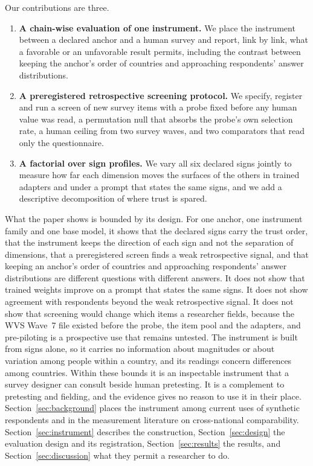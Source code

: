 Our contributions are three.
\begin{enumerate}
\item \textbf{A chain-wise evaluation of one instrument.} We place the instrument between a declared anchor and a human survey and report, link by link, what a favorable or an unfavorable result permits, including the contrast between keeping the anchor's order of countries and approaching respondents' answer distributions.
\item \textbf{A preregistered retrospective screening protocol.} We specify, register and run a screen of new survey items with a probe fixed before any human value was read, a permutation null that absorbs the probe's own selection rate, a human ceiling from two survey waves, and two comparators that read only the questionnaire.
\item \textbf{A factorial over sign profiles.} We vary all six declared signs jointly to measure how far each dimension moves the surfaces of the others in trained adapters and under a prompt that states the same signs, and we add a descriptive decomposition of where trust is spared.
\end{enumerate}

What the paper shows is bounded by its design. For one anchor, one instrument family and one base model, it shows that the declared signs carry the trust order, that the instrument keeps the direction of each sign and not the separation of dimensions, that a preregistered screen finds a weak retrospective signal, and that keeping an anchor's order of countries and approaching respondents' answer distributions are different questions with different answers. It does not show that trained weights improve on a prompt that states the same signs. It does not show agreement with respondents beyond the weak retrospective signal. It does not show that screening would change which items a researcher fields, because the WVS Wave~7 file existed before the probe, the item pool and the adapters, and pre-piloting is a prospective use that remains untested. The instrument is built from signs alone, so it carries no information about magnitudes or about variation among people within a country, and its readings concern differences among countries. Within these bounds it is an inspectable instrument that a survey designer can consult beside human pretesting. It is a complement to pretesting and fielding, and the evidence gives no reason to use it in their place. Section~\ref{sec:background} places the instrument among current uses of synthetic respondents and in the measurement literature on cross-national comparability. Section~\ref{sec:instrument} describes the construction, Section~\ref{sec:design} the evaluation design and its registration, Section~\ref{sec:results} the results, and Section~\ref{sec:discussion} what they permit a researcher to do.

